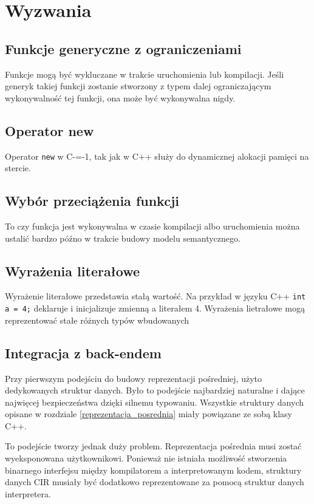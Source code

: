 \section{Wyzwania}

\subsection{Funkcje generyczne z ograniczeniami}

Funkcje mogą być wykluczane w trakcie uruchomienia lub kompilacji. Jeśli generyk takiej funkcji zostanie stworzony z typem dalej ograniczającym wykonywalność tej funkcji, ona może być wykonywalna nigdy.

\subsection{Operator new}

Operator \texttt{new} w C-=-1, tak jak w C++ służy do dynamicznej alokacji pamięci na stercie.


\subsection{Wybór przeciążenia funkcji}
To czy funkcja jest wykonywalna w czasie kompilacji albo uruchomienia można ustalić bardzo późno w trakcie budowy modelu semantycznego.

\subsection{Wyrażenia literałowe}

Wyrażenie literałowe przedstawia stałą wartość.
Na przykład w języku C++ \texttt{int a = 4;} deklaruje i inicjalizuje zmienną a literałem 4.
Wyrażenia lietrałowe mogą reprezentować stałe różnych typów wbudowanych 

\subsection{Integracja z back-endem}
Przy pierwszym podejściu do budowy reprezentacji pośredniej, użyto dedykowanych struktur danych. Było to podejście najbardziej naturalne i dające najwięcej bezpieczeństwa dzięki silnemu typowaniu. Wszystkie struktury danych opisane w rozdziale \ref{reprezentacja_posrednia} miały powiązane ze sobą klasy C++.


To podejście tworzy jednak duży problem. Reprezentacja pośrednia musi zostać wyeksponowana użytkownikowi. Ponieważ nie istniała możliwość stworzenia binarnego interfejsu między kompilatorem a interpretowanym kodem, struktury danych CIR musiały być dodatkowo reprezentowane za pomocą struktur danych interpretera.


